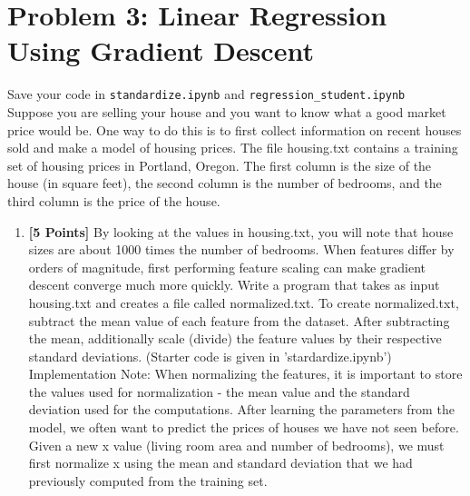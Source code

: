\documentclass{article}
\begin{document}
\section*{Problem 3: Linear Regression Using Gradient Descent} 
Save your code in \texttt{standardize.ipynb}  and \texttt{regression\_student.ipynb} \\
Suppose you are selling your house and you want to know what a good market price would be. One way to do this is to first collect information on recent houses sold and make a model of housing prices. The file housing.txt contains a training set of housing prices in Portland, Oregon. The first column is the size of the house (in square feet), the second column is the number of bedrooms, and the third column is the price of the house.

\begin{enumerate}
\item {\bf [5 Points]} By looking at the values in housing.txt, you will note that house sizes are about 1000 times the number of bedrooms. When features differ by orders of magnitude, first performing feature scaling can make gradient descent converge much more quickly. \newline
Write a program that takes as input housing.txt and creates a file called normalized.txt. To create normalized.txt, subtract the mean value of each feature from the dataset. After subtracting the mean, additionally scale (divide) the feature values by their respective standard deviations. (Starter code is given in 'stardardize.ipynb') \newline
Implementation Note: When normalizing the features, it is important to store the values used for normalization - the mean value and the standard deviation used for the computations. After learning the parameters from the model, we often want to predict the prices of houses we have not seen before. Given a new x value (living room area and number of bedrooms), we must first normalize x using the mean and standard deviation that we had previously computed from the training set.


\end{enumerate}
\end{document}
